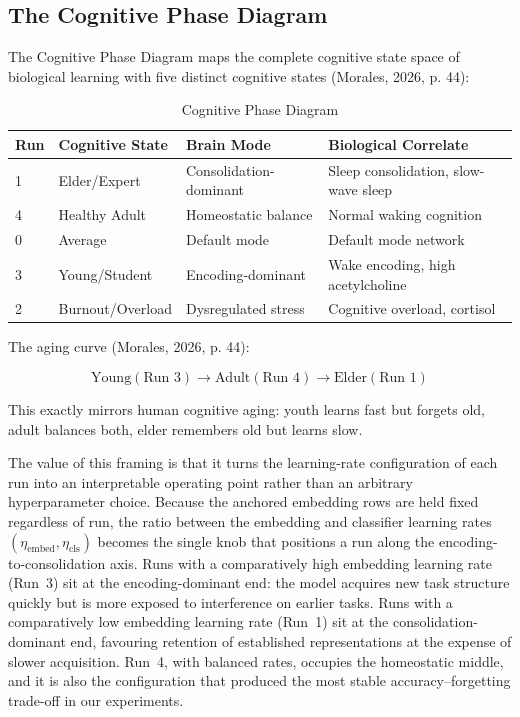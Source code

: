 \documentclass{article}
\begin{document}
\subsection{The Cognitive Phase Diagram}

The Cognitive Phase Diagram maps the complete cognitive state space of biological learning with five distinct cognitive states (Morales, 2026, p. 44):

\begin{table}[ht]
\centering
\caption{Cognitive Phase Diagram}
\begin{tabular}{llll}
\toprule
Run & Cognitive State & Brain Mode & Biological Correlate \\
\midrule
1 & Elder/Expert & Consolidation-dominant & Sleep consolidation, slow-wave sleep \\
4 & Healthy Adult & Homeostatic balance & Normal waking cognition \\
0 & Average & Default mode & Default mode network \\
3 & Young/Student & Encoding-dominant & Wake encoding, high acetylcholine \\
2 & Burnout/Overload & Dysregulated stress & Cognitive overload, cortisol \\
\bottomrule
\end{tabular}
\end{table}

The aging curve (Morales, 2026, p. 44):

\begin{equation}
\text{Young}(\text{Run }3) \rightarrow \text{Adult}(\text{Run }4) \rightarrow \text{Elder}(\text{Run }1)
\end{equation}

This exactly mirrors human cognitive aging: youth learns fast but forgets old, adult balances both, elder remembers old but learns slow.

The value of this framing is that it turns the learning-rate configuration of each run into an interpretable operating point rather than an arbitrary hyperparameter choice. Because the anchored embedding rows are held fixed regardless of run, the ratio between the embedding and classifier learning rates $(\eta_{\text{embed}}, \eta_{\text{cls}})$ becomes the single knob that positions a run along the encoding-to-consolidation axis. Runs with a comparatively high embedding learning rate (Run~3) sit at the encoding-dominant end: the model acquires new task structure quickly but is more exposed to interference on earlier tasks. Runs with a comparatively low embedding learning rate (Run~1) sit at the consolidation-dominant end, favouring retention of established representations at the expense of slower acquisition. Run~4, with balanced rates, occupies the homeostatic middle, and it is also the configuration that produced the most stable accuracy--forgetting trade-off in our experiments.
\end{document}
